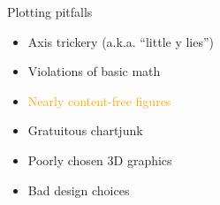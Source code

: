 \documentclass[
  ignorenonframetext,
]{beamer}
\providecommand{\tightlist}{%
  \setlength{\itemsep}{0pt}\setlength{\parskip}{0pt}}
\begin{document}
\begin{frame}{}
\label{section-12}
\end{frame}

\begin{frame}{Plotting pitfalls}
\label{plotting-pitfalls-2}
\begin{itemize}
\tightlist
\item
  Axis trickery (a.k.a. ``little y lies'')
\item
  Violations of basic math
\item
  \textcolor{orange}{Nearly content-free figures}
\item
  Gratuitous chartjunk
\item
  Poorly chosen 3D graphics
\item
  Bad design choices
\end{itemize}
\end{frame}

\begin{frame}{}
\label{section-13}
\end{frame}
\end{document}
